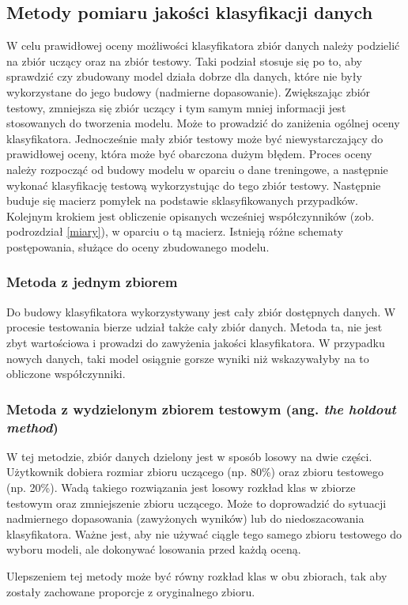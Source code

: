 \subsection{Metody pomiaru jakości klasyfikacji danych} \label {testowanieklasyfikatora}
W celu prawidłowej oceny możliwości klasyfikatora zbiór danych należy podzielić na zbiór uczący oraz na zbiór testowy. Taki podział stosuje się po to, aby sprawdzić czy zbudowany model działa dobrze dla danych, które nie były wykorzystane do jego budowy (nadmierne dopasowanie). Zwiększając zbiór testowy, zmniejsza się zbiór uczący i tym samym mniej informacji jest stosowanych do tworzenia modelu. Może to prowadzić do zaniżenia ogólnej oceny klasyfikatora. Jednocześnie mały zbiór testowy może być niewystarczający do prawidłowej oceny, która może być obarczona dużym błędem. Proces oceny należy rozpocząć od budowy modelu w oparciu o dane treningowe, a następnie wykonać klasyfikację testową wykorzystując do tego zbiór testowy. Następnie buduje się macierz pomyłek na podstawie sklasyfikowanych przypadków. Kolejnym krokiem jest obliczenie opisanych wcześniej współczynników (zob. podrozdział \ref*{miary}), w oparciu o tą macierz. Istnieją różne schematy postępowania, służące do oceny zbudowanego modelu.

\subsubsection{Metoda z jednym zbiorem}
Do budowy klasyfikatora wykorzystywany jest cały zbiór dostępnych danych. W procesie testowania bierze udział także cały zbiór danych. Metoda ta, nie jest zbyt wartościowa i prowadzi do zawyżenia jakości klasyfikatora. W przypadku nowych danych, taki model osiągnie gorsze wyniki niż wskazywałyby na to obliczone współczynniki.

\subsubsection{Metoda z wydzielonym zbiorem testowym (ang. \textit{the holdout method})}
W tej metodzie, zbiór danych dzielony jest w sposób losowy na dwie części. Użytkownik dobiera rozmiar zbioru uczącego (np. 80\%) oraz zbioru testowego (np. 20\%). Wadą takiego rozwiązania jest losowy rozkład klas w zbiorze testowym oraz zmniejszenie zbioru uczącego. Może to doprowadzić do sytuacji nadmiernego dopasowania (zawyżonych wyników) lub do niedoszacowania klasyfikatora. Ważne jest, aby nie używać ciągle tego samego zbioru testowego do wyboru modeli, ale dokonywać losowania przed każdą oceną.\par
Ulepszeniem tej metody może być równy rozkład klas w obu zbiorach, tak aby zostały zachowane proporcje z oryginalnego zbioru.

